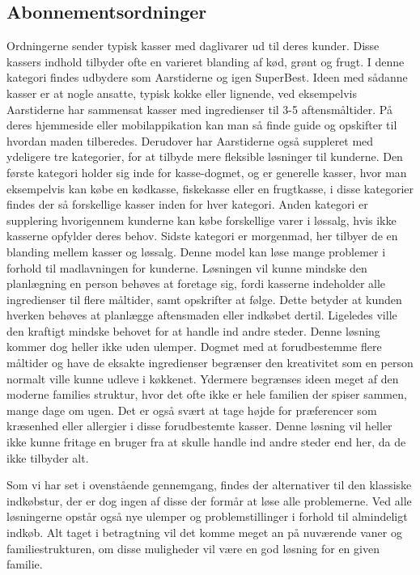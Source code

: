 \subsection{Abonnementsordninger}
Ordningerne sender typisk kasser med daglivarer ud til deres kunder.
Disse kassers indhold tilbyder ofte en varieret blanding af kød, grønt og frugt.
I denne kategori findes udbydere som Aarstiderne og igen SuperBest\citep{SOTA_MP_AAR, SOTA_MP_SB}.
Ideen med sådanne kasser er at nogle ansatte, typisk kokke eller lignende, ved eksempelvis Aarstiderne har sammensat kasser med ingredienser til 3-5 aftensmåltider.
På deres hjemmeside eller mobilappikation kan man så finde guide og opskifter til hvordan maden tilberedes.
Derudover har Aarstiderne også suppleret med ydeligere tre kategorier, for at tilbyde mere fleksible løsninger til kunderne.
Den første kategori holder sig inde for kasse-dogmet, og er generelle kasser, hvor man eksempelvis kan købe en kødkasse, fiskekasse eller en frugtkasse, i disse kategorier findes der så forskellige kasser inden for hver kategori.
Anden kategori er supplering hvorigennem kunderne kan købe forskellige varer i løssalg, hvis ikke kasserne opfylder deres behov.
Sidste kategori er morgenmad, her tilbyer de en blanding mellem kasser og løssalg.
Denne model kan løse mange problemer i forhold til madlavningen for kunderne.
Løsningen vil kunne mindske den planlægning en person behøves at foretage sig, fordi kasserne indeholder alle ingredienser til flere måltider, samt opskrifter at følge.
Dette betyder at kunden  hverken behøves at planlægge aftensmaden eller indkøbet dertil.
Ligeledes ville den kraftigt mindske behovet for at handle ind andre steder.
Denne løsning kommer dog heller ikke uden ulemper.
Dogmet med at forudbestemme flere måltider og have de eksakte ingredienser begrænser den kreativitet som en person normalt ville kunne udleve i køkkenet.
Ydermere begrænses ideen meget af den moderne families struktur, hvor det ofte ikke er hele familien der spiser sammen, mange dage om ugen. 
Det er også svært at tage højde for præferencer som kræsenhed eller allergier i disse forudbestemte kasser.
Denne løsning vil heller ikke kunne fritage en bruger fra at skulle handle ind andre steder end her, da de ikke tilbyder alt.

Som vi har set i ovenstående gennemgang, findes der alternativer til den klassiske indkøbstur, der er dog ingen af disse der formår at løse alle problemerne.
Ved alle løsningerne opstår også nye ulemper og problemstillinger i forhold til almindeligt indkøb.
Alt taget i betragtning vil det komme meget an på nuværende vaner og familiestrukturen, om disse muligheder vil være en god løsning for en given familie.

